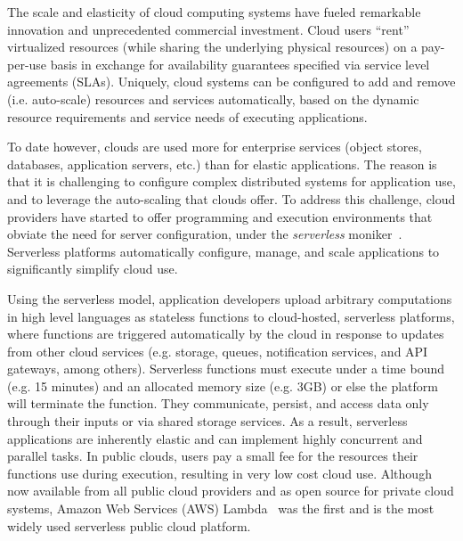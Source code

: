 The scale and elasticity of cloud computing systems have 
fueled remarkable innovation and unprecedented commercial 
investment.  Cloud users ``rent'' virtualized resources (while sharing
the underlying physical resources) on a pay-per-use basis
in exchange for availability guarantees specified via service level
agreements (SLAs). Uniquely, cloud systems can be configured 
to add and remove (i.e. auto-scale) resources and services
automatically, based on the dynamic resource requirements and service needs 
of executing applications.

To date however, clouds are used more for
enterprise services (object stores, databases, application servers, etc.)
than for elastic applications.
The reason is that it is challenging to configure complex
distributed systems for application use, 
and to leverage the auto-scaling that
clouds offer. To address this challenge, cloud providers 
have started to offer programming and execution environments
that obviate the need for server configuration,
under the \textit{serverless} moniker~\cite{ref:jonas2017occupy,ref:onesteptwostep,ref:peeking}.  
Serverless platforms automatically configure, manage, and scale applications
to significantly simplify cloud use.

Using the serverless model, application developers upload arbitrary computations in high level languages as stateless functions to cloud-hosted, serverless platforms, where functions are triggered automatically by the cloud in response to updates from other cloud services (e.g. storage, queues, notification services, and API gateways, 
among others). Serverless functions must execute under a time bound (e.g. 15 minutes) and an allocated memory size 
(e.g. 3GB) or else the platform will terminate the function. They
communicate, persist, and access data only 
through their inputs or via shared storage services. As a result, serverless applications are inherently elastic and can 
implement highly concurrent and parallel tasks.
In public clouds, users pay a small fee for the resources their 
functions use during execution, resulting in very low cost cloud use.
Although now available from all public cloud providers and as open 
source for private cloud systems, 
Amazon Web Services (AWS) Lambda~\cite{ref:awslambdadg}
was the first and is the most widely used
serverless public cloud platform.


